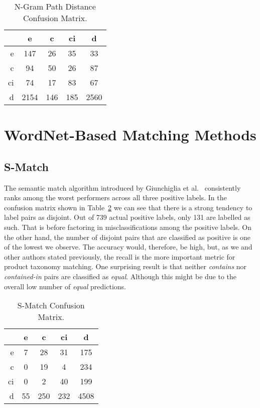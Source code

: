 \begin{table}[htbp]
 \begin{center}
  \begin{tabular}{r|cccc}
   & e & c & ci & d \\
   \hline
   e & 147 & 26 & 35 & 33 \\
   c & 94 & 50 & 26 & 87 \\
   ci & 74 & 17 & 83 & 67 \\
   d & 2154 & 146 & 185 & 2560 \\
  \end{tabular}
  \caption{N-Gram Path Distance Confusion Matrix.}
  \label{tab:ngram-pd-cm}
 \end{center}
\end{table}

\section{WordNet-Based Matching Methods}

\subsection{S-Match}

The semantic match algorithm introduced by Giunchiglia et al.~\cite{giunchiglia2005semantic} consistently ranks among
the worst performers across all three positive labels.
In the confusion matrix shown in Table~\ref{tab:smatch-cm} we can see that there is a strong tendency to label pairs as
disjoint.
Out of 739 actual positive labels, only 131 are labelled as such.
That is before factoring in misclassifications among the positive labels.
On the other hand, the number of disjoint pairs that are classified as positive is one of the lowest we observe.
The accuracy would, therefore, be high, but, as we and other authors stated previously, the recall is the more important
metric for product taxonomy matching.
One surprising result is that neither \emph{contains} nor \emph{contained-in} pairs are classified as \emph{equal}.
Although this might be due to the overall low number of \emph{equal} predictions.

\begin{table}[htbp]
 \begin{center}
  \begin{tabular}{r|cccc}
   & e & c & ci & d \\
   \hline
   e & 7 & 28 & 31 & 175 \\
   c & 0 & 19 & 4 & 234 \\
   ci & 0 & 2 & 40 & 199 \\
   d & 55 & 250 & 232 & 4508 \\
  \end{tabular}
  \caption{S-Match Confusion Matrix.}
  \label{tab:smatch-cm}
 \end{center}
\end{table}

